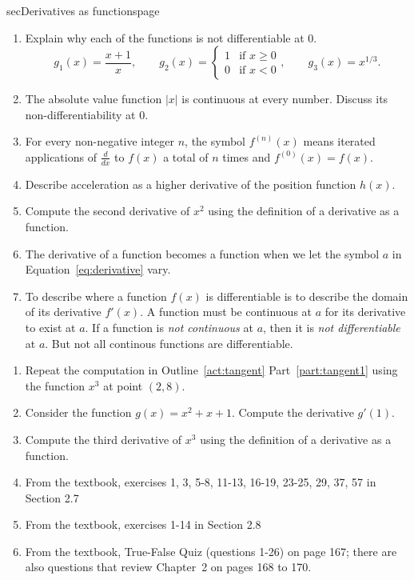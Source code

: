 \documentclass[../main]{subfiles}
\begin{document}
\begin{outline}{sec}{Derivatives as functions}{page}
\begin{enumerate}
    \item Explain why each of the functions is not differentiable at \(0\). 
      \[
        g_{1}(x) = \frac{x+1}{x}, 
        \hspace{2em}
        g_{2}(x) = \begin{cases} 1 & \text{if } x \ge 0 \\ 0 & \text{if } x < 0 \end{cases},
        \hspace{2em}
        g_{3}(x) = x^{1/3}.
      \]
    \item The absolute value function \(|x|\) is continuous at every number. Discuss its non-differentiability at \(0\).
    \item {For every non-negative integer \(n\), the symbol \(f^{(n)}(x)\) means iterated applications of \(\frac{d}{dx}\) to \(f(x)\) a total of \(n\) times and \(f^{(0)}(x) = f(x)\).}
    \item Describe acceleration as a higher derivative of the position function \(h(x)\).
    \item Compute the second derivative of \(x^{2}\) using the definition of a derivative as a function.
    \item {The derivative of a function becomes a function when we let the symbol \(a\) in Equation~\eqref{eq:derivative} vary.}
    \item {To describe where a function \(f(x)\) is differentiable is to describe the domain of its derivative \(f'(x)\). A function must be continuous at \(a\) for its derivative to exist at \(a\).  If a function is \emph{not continuous} at \(a\), then it is \emph{not differentiable} at \(a\).  But not all continous functions are differentiable.}
  \end{enumerate}
\end{outline}




%
%
\begin{enumerate}
\item Repeat the computation in Outline~\ref{act:tangent} Part~\ref{part:tangent1} using the function \(x^{3}\) at point \((2,8)\).
\item Consider the function \(g(x) = x^{2} + x + 1\). Compute the derivative \(g'(1)\).
\item Compute the third derivative of \(x^{3}\) using the definition of a derivative as a function.
\item From the textbook, exercises 1, 3, 5-8, 11-13, 16-19, 23-25, 29, 37, 57 in Section 2.7
\item From the textbook, exercises  1-14 in Section 2.8
\item From the textbook, True-False Quiz (questions 1-26) on page 167; there are also questions that review Chapter~2 on pages 168 to 170. 
\end{enumerate}
\end{document}
